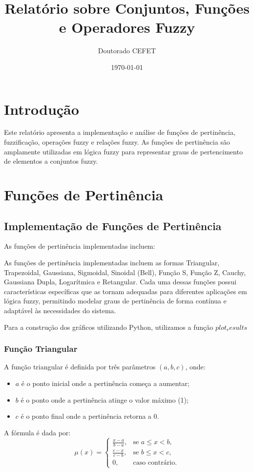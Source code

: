 \documentclass[a4paper,12pt]{article}
\title{Relatório sobre Conjuntos, Funções e Operadores Fuzzy}
\author{Doutorado CEFET}
\date{\today}
\begin{document}
\maketitle
\justifying
\section{Introdução}
Este relatório apresenta a implementação e análise de funções de pertinência, fuzzificação, operações fuzzy e relações fuzzy. As funções de pertinência são amplamente utilizadas em lógica fuzzy para representar graus de pertencimento de elementos a conjuntos fuzzy.

\section{Funções de Pertinência}
\subsection{Implementação de Funções de Pertinência}

As funções de pertinência implementadas incluem:


As funções de pertinência implementadas incluem as formas Triangular, Trapezoidal, Gaussiana, Sigmoidal, Sinoidal (Bell), Função S, Função Z, Cauchy, Gaussiana Dupla, Logarítmica e Retangular. Cada uma dessas funções possui características específicas que as tornam adequadas para diferentes aplicações em lógica fuzzy, permitindo modelar graus de pertinência de forma contínua e adaptável às necessidades do sistema.

Para a construção dos gráficos utilizando Python, utilizamos a função $plot_results$
    
\subsubsection{Função Triangular}
A função triangular é definida por três parâmetros $(a, b, c)$, onde:
\begin{itemize}
    \item $a$ é o ponto inicial onde a pertinência começa a aumentar;
    \item $b$ é o ponto onde a pertinência atinge o valor máximo (1);
    \item $c$ é o ponto final onde a pertinência retorna a 0.
\end{itemize}
A fórmula é dada por:
\[
\mu(x) =
\begin{cases}
\frac{x - a}{b - a}, & \text{se } a \leq x < b, \\
\frac{c - x}{c - b}, & \text{se } b \leq x < c, \\
0, & \text{caso contrário.}
\end{cases}
\]
\end{document}
